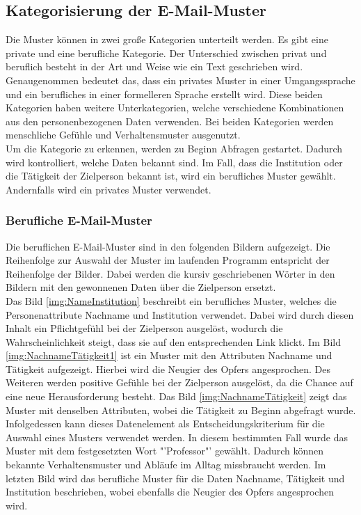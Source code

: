 	\subsection{Kategorisierung der E-Mail-Muster}
	Die Muster können in zwei große Kategorien unterteilt werden. Es gibt eine private und eine berufliche Kategorie. Der Unterschied zwischen privat und beruflich besteht in der Art und Weise wie ein Text geschrieben wird. Genaugenommen bedeutet das, dass ein privates Muster in einer Umgangssprache und ein berufliches in einer formelleren Sprache erstellt wird. Diese beiden Kategorien haben weitere Unterkategorien, welche verschiedene Kombinationen aus den personenbezogenen Daten verwenden. Bei beiden Kategorien werden menschliche Gefühle und Verhaltensmuster ausgenutzt.\\
	Um die Kategorie zu erkennen, werden zu Beginn Abfragen gestartet. Dadurch wird kontrolliert, welche Daten bekannt sind. Im Fall, dass die Institution oder die Tätigkeit der Zielperson bekannt ist, wird ein berufliches Muster gewählt. Andernfalls wird ein privates Muster verwendet.
	
		\subsubsection{Berufliche E-Mail-Muster}
		\label{subsubsec:beruflicheMuster}
		Die beruflichen E-Mail-Muster sind in den folgenden Bildern aufgezeigt. Die Reihenfolge zur Auswahl der Muster im laufenden Programm entspricht der Reihenfolge der Bilder. Dabei werden die kursiv geschriebenen Wörter in den Bildern mit den gewonnenen Daten über die Zielperson ersetzt.\\ 
		Das Bild \ref{img:NameInstitution} beschreibt ein berufliches Muster, welches die Personenattribute Nachname und Institution verwendet. Dabei wird durch diesen Inhalt ein Pflichtgefühl bei der Zielperson ausgelöst, wodurch die Wahrscheinlichkeit steigt, dass sie auf den entsprechenden Link klickt. Im Bild \ref{img:NachnameTätigkeit1} ist ein Muster mit den Attributen Nachname und Tätigkeit aufgezeigt. Hierbei wird die Neugier des Opfers angesprochen. Des Weiteren werden positive Gefühle bei der Zielperson ausgelöst, da die Chance auf eine neue Herausforderung besteht. Das Bild \ref{img:NachnameTätigkeit} zeigt das Muster mit denselben Attributen, wobei die Tätigkeit zu Beginn abgefragt wurde. Infolgedessen kann dieses Datenelement als Entscheidungskriterium für die Auswahl eines Musters verwendet werden. In diesem bestimmten Fall wurde das Muster mit dem festgesetzten Wort "'Professor"' gewählt. Dadurch können bekannte Verhaltensmuster und Abläufe im Alltag missbraucht werden. Im letzten Bild wird das berufliche Muster für die Daten Nachname, Tätigkeit und Institution beschrieben, wobei ebenfalls die Neugier des Opfers angesprochen wird.\\
		
